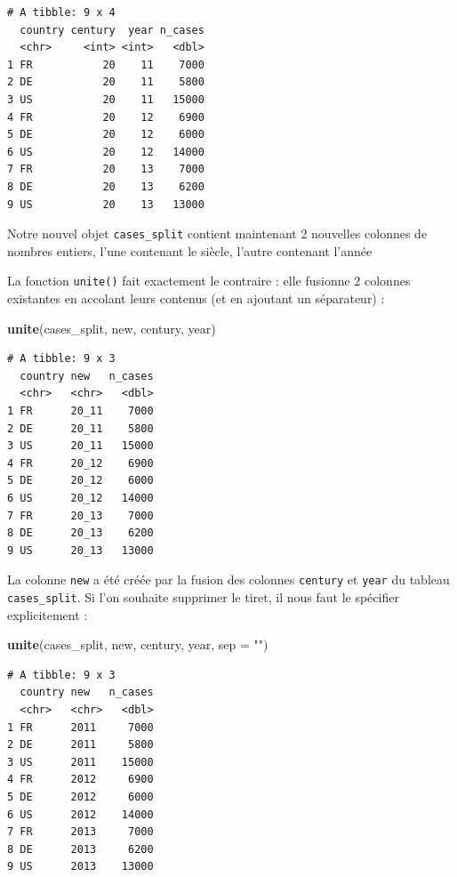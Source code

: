 \documentclass[a4paperpaper,]{article}
\newenvironment{Shaded}{\begin{snugshade}}{\end{snugshade}}
\newcommand{\DataTypeTok}[1]{\textcolor[rgb]{0.00,0.34,0.68}{#1}}
\newcommand{\KeywordTok}[1]{\textcolor[rgb]{0.12,0.11,0.11}{\textbf{#1}}}
\newcommand{\NormalTok}[1]{\textcolor[rgb]{0.12,0.11,0.11}{#1}}
\newcommand{\StringTok}[1]{\textcolor[rgb]{0.75,0.01,0.01}{#1}}
\theoremstyle{definition}
\theoremstyle{definition}
\theoremstyle{definition}
\theoremstyle{remark}
\begin{document}
\begin{verbatim}
# A tibble: 9 x 4
  country century  year n_cases
  <chr>     <int> <int>   <dbl>
1 FR           20    11    7000
2 DE           20    11    5800
3 US           20    11   15000
4 FR           20    12    6900
5 DE           20    12    6000
6 US           20    12   14000
7 FR           20    13    7000
8 DE           20    13    6200
9 US           20    13   13000
\end{verbatim}

Notre nouvel objet \texttt{cases\_split} contient maintenant 2 nouvelles
colonnes de nombres entiers, l'une contenant le siècle, l'autre
contenant l'année

La fonction \texttt{unite()} fait exactement le contraire : elle
fusionne 2 colonnes existantes en accolant leurs contenus (et en
ajoutant un séparateur) :

\begin{Shaded}
\begin{Highlighting}[]
\KeywordTok{unite}\NormalTok{(cases_split, new, century, year)}
\end{Highlighting}
\end{Shaded}

\begin{verbatim}
# A tibble: 9 x 3
  country new   n_cases
  <chr>   <chr>   <dbl>
1 FR      20_11    7000
2 DE      20_11    5800
3 US      20_11   15000
4 FR      20_12    6900
5 DE      20_12    6000
6 US      20_12   14000
7 FR      20_13    7000
8 DE      20_13    6200
9 US      20_13   13000
\end{verbatim}

La colonne \texttt{new} a été créée par la fusion des colonnes
\texttt{century} et \texttt{year} du tableau \texttt{cases\_split}. Si
l'on souhaite supprimer le tiret, il nous faut le spécifier
explicitement :

\begin{Shaded}
\begin{Highlighting}[]
\KeywordTok{unite}\NormalTok{(cases_split, new, century, year, }\DataTypeTok{sep =} \StringTok{""}\NormalTok{)}
\end{Highlighting}
\end{Shaded}

\begin{verbatim}
# A tibble: 9 x 3
  country new   n_cases
  <chr>   <chr>   <dbl>
1 FR      2011     7000
2 DE      2011     5800
3 US      2011    15000
4 FR      2012     6900
5 DE      2012     6000
6 US      2012    14000
7 FR      2013     7000
8 DE      2013     6200
9 US      2013    13000
\end{verbatim}
\end{document}
